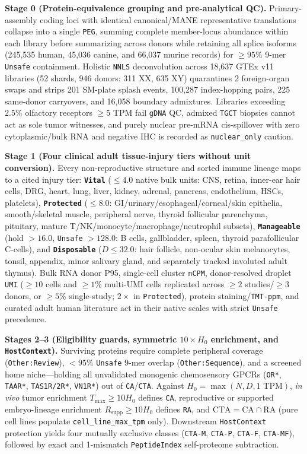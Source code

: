 \documentclass[10pt,letterpaper]{article}
\begin{document}
\textbf{Stage 0 (Protein-equivalence grouping and pre-analytical QC).} Primary-assembly coding loci with identical canonical/MANE representative translations collapse into a single \texttt{PEG}, summing complete member-locus abundance within each library before summarizing across donors while retaining all splice isoforms (245,535 human, 45,036 canine, and 66,037 murine records) for $\ge 95\%$ 9-mer \texttt{Unsafe} containment. Holistic \texttt{NNLS} deconvolution across 18,637 GTEx v11 libraries (52 shards, 946 donors: 311 XX, 635 XY) quarantines 2 foreign-organ swaps and strips 201 SM-plate splash events, 100,287 index-hopping pairs, 225 same-donor carryovers, and 16,058 boundary admixtures. Libraries exceeding $2.5\%$ olfactory receptors $\ge 5\text{ TPM}$ fail \texttt{gDNA} QC, admixed \texttt{TGCT} biopsies cannot act as sole tumor witnesses, and purely nuclear pre-mRNA cis-spillover with zero cytoplasmic/bulk RNA and negative IHC is recorded as \texttt{nuclear\_only} caution.

\textbf{Stage 1 (Four clinical adult tissue-injury tiers without unit conversion).} Every non-reproductive structure and sorted immune lineage maps to a cited injury tier: \textbf{\texttt{Vital}} ($\le 4.0$ native bulk units: CNS, retina, inner-ear hair cells, DRG, heart, lung, liver, kidney, adrenal, pancreas, endothelium, HSCs, platelets), \textbf{\texttt{Protected}} ($\le 8.0$: GI/urinary/esophageal/corneal/skin epithelia, smooth/skeletal muscle, peripheral nerve, thyroid follicular parenchyma, pituitary, mature T/NK/monocyte/macrophage/neutrophil subsets), \textbf{\texttt{Manageable}} (hold $>16.0$, \texttt{Unsafe} $>128.0$: B cells, gallbladder, spleen, thyroid parafollicular C-cells), and \textbf{\texttt{Disposable}} ($D \le 32.0$: hair follicle, non-ocular skin melanocytes, tonsil, appendix, minor salivary gland, and separately tracked involuted adult thymus). Bulk RNA donor P95, single-cell cluster \texttt{nCPM}, donor-resolved droplet \texttt{UMI} ($\ge 10$ cells and $\ge 1\%$ multi-UMI cells replicated across $\ge 2$ studies/$\ge 3$ donors, or $\ge 5\%$ single-study; $2\times$ in \texttt{Protected}), protein staining/\texttt{TMT-ppm}, and curated adult human literature act in their native scales with strict \texttt{Unsafe} precedence.

\textbf{Stages 2--3 (Eligibility guards, symmetric $10\times H_0$ enrichment, and \texttt{HostContext}).} Surviving proteins require complete peripheral coverage (\texttt{Other:Review}), $<95\%$ \texttt{Unsafe} 9-mer overlap (\texttt{Other:Sequence}), and a screened home niche---holding all unvalidated monogenic chemosensory GPCRs (\texttt{OR*}, \texttt{TAAR*}, \texttt{TAS1R/2R*}, \texttt{VN1R*}) out of \texttt{CA}/\texttt{CTA}. Against $H_0 = \max(N, D, 1\text{ TPM})$, \emph{in vivo} tumor enrichment $T_{\max} \ge 10 H_0$ defines \texttt{CA}, reproductive or supported embryo-lineage enrichment $R_{\text{supp}} \ge 10 H_0$ defines \texttt{RA}, and $\text{CTA} = \text{CA} \cap \text{RA}$ (pure cell lines populate \texttt{cell\_line\_max\_tpm} only). Downstream \texttt{HostContext} protection yields four mutually exclusive classes (\texttt{CTA-M}, \texttt{CTA-P}, \texttt{CTA-F}, \texttt{CTA-MF}), followed by exact and 1-mismatch \texttt{PeptideIndex} self-proteome subtraction.
\end{document}
